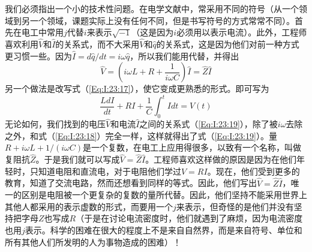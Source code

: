 \begin{table}[H]
    \centering
    \caption{}
    \label{Table:23:1}
\end{table}

我们必须指出一个小的技术性问题。在电学文献中，常采用不同的符号（从一个领域到另一个领域，课题实际上没有任何不同，但是书写符号的方式常常不同）。首先在电工中常用$j$代替$i$来表示$\sqrt{-1}$（这是因为$i$必须用以表示电流）。此外，工程师喜欢利用$\hat{V}$和$\hat{I}$的关系式，而不大采用$\hat{V}$和$\hat{q}$的关系式，这是因为他们对前一种方式更习惯一些。因为$\hat{I}=d\hat{q}/dt=i\omega\hat{q}$，所以我们能用代替，并得出
\begin{equation}
    \label{Eq:I:23:19}
    \hat{V}=\left ( i\omega L + R + \frac{1}{i\omega C} \right ) \hat{I} = \hat{Z}\hat{I}
\end{equation}
另一个做法是改写式（\ref{Eq:I:23:17}），使它变成更熟悉的形式。即可写为
\begin{equation}
    \label{Eq:I:23:20}
    \frac{LdI}{dt} + RI + \frac{1}{C}\int_0^tIdt=V(t)
\end{equation}
无论如何，我们找到的电压$\hat{V}$和电流$\hat{I}$之间的关系式（\ref{Eq:I:23:19}），除了被$i\omega$去除之外，和式（\ref{Eq:I:23:18}）完全一样，这样就得出了式（\ref{Eq:I:23:19}）。量$R+i\omega L+1/(i\omega C)$是一个复数，在电工上应用得很多，以致有一个名称，叫做复阻抗$\hat{Z}$。于是我们就可以写成$\hat{V}=\hat{Z}\hat{I}$。工程师喜欢这样做的原因是因为在他们年轻时，只知道电阻和直流电，对于电阻他们学过$V=RI$。现在，他们受到更多的教育，知道了交流电路，然而还想看到同样的等式。因此，他们写出$\hat{V}=\hat{Z}\hat{I}$，唯一的区别是电阻被一个更复杂的复数的量所代替。因此，他们坚持不能采用世界上其他人都采用的表示虚数的形式，而要用一个$j$来表示，但奇怪的是他们并没有坚持把字母$Z$也写成$R$（于是在讨论电流密度时，他们就遇到了麻烦，因为电流密度也用$j$表示。科学的困难在很大的程度上不是来自自然界，而是来自符号、单位和所有其他人们所发明的人为事物造成的困难）！

